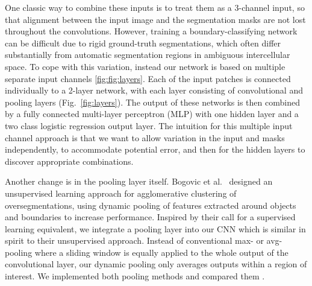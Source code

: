 One classic way to combine these inputs is to treat them as a 3-channel input, so that alignment between the input image and the segmentation masks are not lost throughout the convolutions. However, training a boundary-classifying network can be difficult due to rigid ground-truth segmentations, which often differ substantially from automatic segmentation regions in ambiguous intercellular space. To cope with this variation, instead our network is based on multiple separate input channels \ref{fig:fig:layers}. Each of the input patches is connected individually to a 2-layer network, with each layer consisting of convolutional and pooling layers (Fig.~\ref{fig:layers}). The output of these networks is then combined by a fully connected multi-layer perceptron (MLP) with one hidden layer and a two class logistic regression output layer. The intuition for this multiple input channel approach is that we want to allow variation in the input and masks independently, to accommodate potential error, and then for the hidden layers to discover appropriate combinations.

Another change is in the pooling layer itself. Bogovic et al.~\cite{BogovicHJ13} designed an unsupervised learning approach for agglomerative clustering of oversegmentations, using dynamic pooling of features extracted around objects and boundaries to increase performance. Inspired by their call for a supervised learning equivalent, we integrate a pooling layer into our CNN which is similar in spirit to their unsupervised approach. Instead of conventional max- or avg-pooling where a sliding window is equally applied to the whole output of the convolutional layer, our dynamic pooling only averages outputs within a region of interest. We implemented both pooling methods and compared them .

